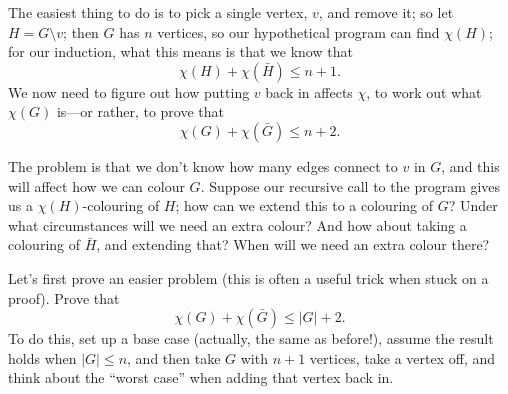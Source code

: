\documentclass{article}
\begin{document}
The easiest thing to do is to pick a single vertex, $v$, and remove it; so let $H=G\setminus v$; then $G$ has $n$ vertices, so our hypothetical program can find $\chi(H)$; for our induction, what this means is that we know that
\[\chi(H)+\chi(\bar{H})\leq n+1.\]
We now need to figure out how putting $v$ back in affects $\chi$, to work out what $\chi(G)$ is---or rather, to prove that
\[\chi(G)+\chi(\bar{G})\leq n+2.\]

The problem is that we don't know how many edges connect to $v$ in $G$, and this will affect how we can colour $G$. Suppose our recursive call to the program gives us a $\chi(H)$-colouring of $H$; how can we extend this to a colouring of $G$? Under what circumstances will we need an extra colour? And how about taking a colouring of $\bar{H}$, and extending that? When will we need an extra colour there?\bigskip


Let's first prove an easier problem (this is often a useful trick when stuck on a proof). Prove that
\[\chi(G)+\chi(\bar{G})\leq |G|+2.\]
To do this, set up a base case (actually, the same as before!), assume the result holds when $|G|\leq n$, and then take $G$ with $n+1$ vertices, take a vertex off, and think about the ``worst case'' when adding that vertex back in.
\end{document}
